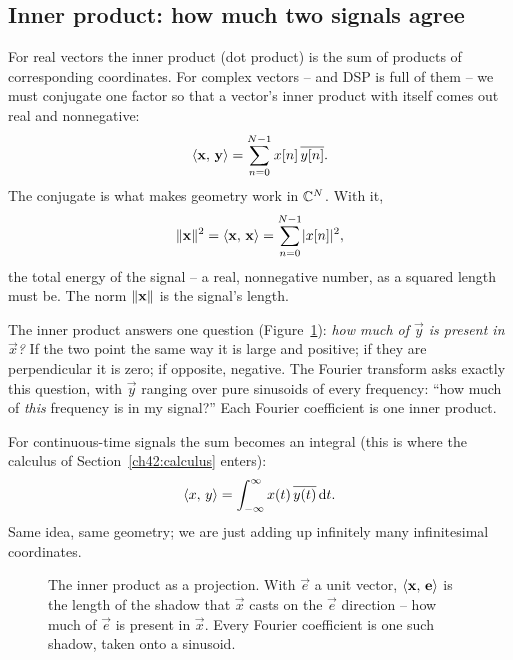 \subsection{Inner product: how much two signals agree}

For real vectors the inner product (dot product) is the sum of products of corresponding
coordinates. For complex vectors -- and DSP is full of them -- we must conjugate one factor so
that a vector's inner product with itself comes out real and nonnegative:
\[
  \langle \mathbf{x},\, \mathbf{y} \rangle = \sum_{n=0}^{N-1} x[n]\,\overline{y[n]}.
\]
The conjugate is what makes geometry work in $\mathbb{C}^N$. With it,
\[
  \lVert\mathbf{x}\rVert^2 = \langle \mathbf{x},\, \mathbf{x} \rangle = \sum_{n=0}^{N-1} \lvert x[n]\rvert^2,
\]
the total energy of the signal -- a real, nonnegative number, as a squared length must be. The
norm $\lVert\mathbf{x}\rVert$ is the signal's length.

\begin{intuitionbox}
The inner product answers one question (Figure~\ref{ch42:fig-projection}): \emph{how much of
$\vec y$ is present in $\vec x$?} If the
two point the same way it is large and positive; if they are perpendicular it is zero; if
opposite, negative. The Fourier transform asks exactly this question, with $\vec y$ ranging over
pure sinusoids of every frequency: ``how much of \emph{this} frequency is in my signal?'' Each
Fourier coefficient is one inner product.
\end{intuitionbox}

For continuous-time signals the sum becomes an integral (this is where the calculus of
Section~\ref{ch42:calculus} enters):
\[
  \langle x,\, y \rangle = \int_{-\infty}^{\infty} x(t)\,\overline{y(t)}\,\mathrm{d} t.
\]
Same idea, same geometry; we are just adding up infinitely many infinitesimal coordinates.

\begin{figure}[H]
\centering
{}
\caption{The inner product as a projection. With $\vec e$ a unit vector, $\langle \mathbf{x},\, \mathbf{e} \rangle$
is the length of the shadow that $\vec x$ casts on the $\vec e$ direction -- how much of $\vec e$
is present in $\vec x$. Every Fourier coefficient is one such shadow, taken onto a sinusoid.}
\label{ch42:fig-projection}
\end{figure}

